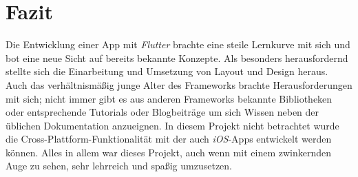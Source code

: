 \section{Fazit}

Die Entwicklung einer App mit \textit{Flutter}
brachte eine steile Lernkurve mit sich und bot
eine neue Sicht auf bereits bekannte Konzepte.
Als besonders herausfordernd stellte sich die
Einarbeitung und Umsetzung von Layout und Design
heraus. Auch das verhältnismäßig junge Alter
des Frameworks brachte Herausforderungen mit sich;
nicht immer gibt es aus anderen Frameworks bekannte
Bibliotheken oder entsprechende Tutorials oder
Blogbeiträge um sich Wissen neben der üblichen
Dokumentation anzueignen. In diesem Projekt nicht
betrachtet wurde die Cross-Plattform-Funktionalität
mit der auch \textit{iOS}-Apps entwickelt werden können.
Alles in allem war dieses Projekt,
auch wenn mit einem zwinkernden Auge zu sehen,
sehr lehrreich und spaßig umzusetzen.
